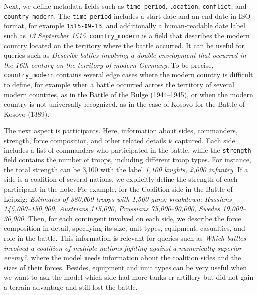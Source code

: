 Next, we define metadata fields such as \texttt{time\_period}, \texttt{location}, \texttt{conflict}, and \texttt{country\_modern}. The \texttt{time\_period} includes a start date and an end date in ISO format, for example \texttt{1515-09-13}, and additionally a human-readable date label such as \textit{13 September 1515}. \texttt{country\_modern} is a field that describes the modern country located on the territory where the battle occurred. It can be useful for queries such as \textit{Describe battles involving a double envelopment that occurred in the 16th century on the territory of modern Germany.} To be precise, \texttt{country\_modern} contains several edge cases where the modern country is difficult to define, for example when a battle occurred across the territory of several modern countries, as in the Battle of the Bulge (1944–1945), or when the modern country is not universally recognized, as in the case of Kosovo for the Battle of Kosovo (1389).

The next aspect is participants. Here, information about sides, commanders, strength, force composition, and other related details is captured. Each side includes a list of commanders who participated in the battle, while the \texttt{strength} field contains the number of troops, including different troop types. For instance, the total strength can be 3,100 with the label \textit{1,100 knights, 2,000 infantry}. If a side is a coalition of several nations, we explicitly define the strength of each participant in the note. For example, for the Coalition side in the Battle of Leipzig: \textit{Estimates of 380,000 troops with 1,500 guns; breakdown: Russians 145,000–150,000, Austrians 115,000, Prussians 75,000–90,000, Swedes 19,000–30,000.} Then, for each contingent involved on each side, we describe the force composition in detail, specifying its size, unit types, equipment, casualties, and role in the battle. This information is relevant for queries such as \textit{Which battles involved a coalition of multiple nations fighting against a numerically superior enemy?}, where the model needs information about the coalition sides and the sizes of their forces. Besides, equipment and unit types can be very useful when we want to ask the model which side had more tanks or artillery but did not gain a terrain advantage and still lost the battle.

